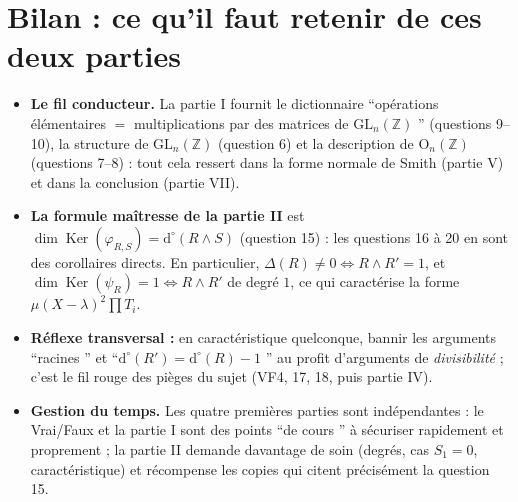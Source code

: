 \documentclass[11pt,a4paper]{article}
\newcommand{\og}{``}
\newcommand{\fg}{''}
\newcommand{\Z}{\mathbb{Z}}
\newcommand{\GLn}[1][n]{\mathrm{GL}_{#1}}
\newcommand{\On}[1][n]{\mathrm{O}_{#1}}
\newcommand{\dg}[1]{\mathrm{d}^{\circ}\!\left(#1\right)}
\DeclareMathOperator{\Ker}{Ker}
\begin{document}
\section*{Bilan : ce qu'il faut retenir de ces deux parties}

\begin{conseil}
\begin{itemize}[leftmargin=1.4em, itemsep=2pt]
\item \textbf{Le fil conducteur.} La partie I fournit le dictionnaire
\og opérations élémentaires $=$ multiplications par des matrices de
$\GLn(\Z)$ \fg{} (questions 9--10), la structure de $\GLn(\Z)$
(question 6) et la description de $\On(\Z)$ (questions 7--8) : tout
cela ressert dans la forme normale de Smith (partie V) et dans la
conclusion (partie VII).
\item \textbf{La formule maîtresse de la partie II} est
$\dim\Ker(\varphi_{R,S})=\dg{R\wedge S}$ (question 15) : les
questions 16 à 20 en sont des corollaires directs. En particulier,
$\Delta(R)\neq 0\iff R\wedge R'=1$, et
$\dim\Ker(\psi_R)=1\iff R\wedge R'$ de degré $1$, ce qui caractérise
la forme $\mu(X-\lambda)^2\prod T_i$.
\item \textbf{Réflexe transversal :} en caractéristique quelconque,
bannir les arguments \og racines \fg{} et \og $\dg{R'}=\dg{R}-1$ \fg{}
au profit d'arguments de \emph{divisibilité} ; c'est le fil rouge des
pièges du sujet (VF4, 17, 18, puis partie IV).
\item \textbf{Gestion du temps.} Les quatre premières parties sont
indépendantes : le Vrai/Faux et la partie I sont des points
\og de cours \fg{} à sécuriser rapidement et proprement ; la partie
II demande davantage de soin (degrés, cas $S_1=0$, caractéristique)
et récompense les copies qui citent précisément la question 15.
\end{itemize}
\end{conseil}
\end{document}

